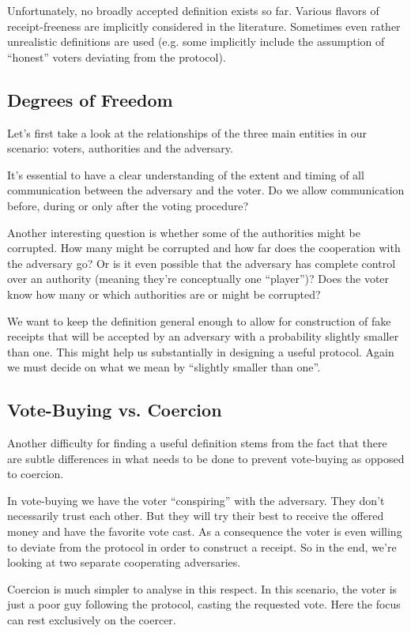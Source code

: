 \documentclass{article}
\begin{document}
Unfortunately, no broadly accepted definition exists so far. Various flavors of receipt-freeness are implicitly considered in the literature. Sometimes even rather unrealistic definitions are used (e.g. some implicitly include the assumption of ``honest'' voters deviating from the protocol).


\subsection{Degrees of Freedom}
Let's first take a look at the relationships of the three main entities in our scenario: voters, authorities and the adversary.

It's essential to have a clear understanding of the extent and timing of all communication between the adversary and the voter. Do we allow communication before, during or only after the voting procedure?

Another interesting question is whether some of the authorities might be corrupted. How many might be corrupted and how far does the cooperation with the adversary go? Or is it even possible that the adversary has complete control over an authority (meaning they're conceptually one ``player'')? Does the voter know how many or which authorities are or might be corrupted?

We want to keep the definition general enough to allow for construction of fake receipts that will be accepted by an adversary with a probability slightly smaller than one. This might help us substantially in designing a useful protocol. Again we must decide on what we mean by ``slightly smaller than one''.

\subsection{Vote-Buying vs. Coercion}
Another difficulty for finding a useful definition stems from the fact that there are subtle differences in what needs to be done to prevent vote-buying as opposed to coercion.

In vote-buying we have the voter ``conspiring'' with the adversary. They don't necessarily trust each other. But they will try their best to receive the offered money and have the favorite vote cast. As a consequence the voter is even willing to deviate from the protocol in order to construct a receipt. So in the end, we're looking at two separate cooperating adversaries.

Coercion is much simpler to analyse in this respect. In this scenario, the voter is just a poor guy following the protocol, casting the requested vote. Here the focus can rest exclusively on the coercer.
\end{document}

